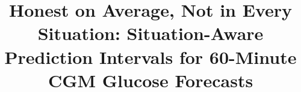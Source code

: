\title{Honest on Average, Not in Every Situation: Situation-Aware Prediction Intervals for 60-Minute CGM Glucose Forecasts}

